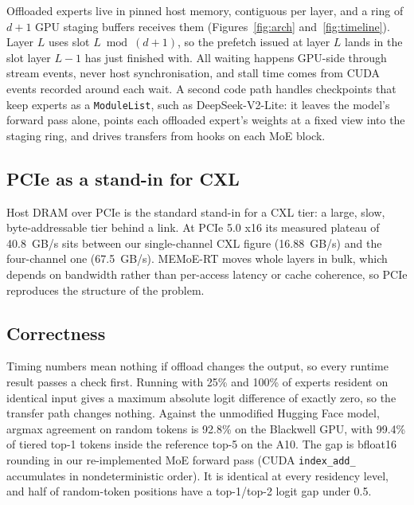 \documentclass[10pt,a4paper]{article}
\begin{document}
Offloaded experts live in pinned host memory, contiguous per layer, and a ring of
$d{+}1$ GPU staging buffers receives them (Figures~\ref{fig:arch}
and~\ref{fig:timeline}). Layer $L$ uses slot $L \bmod (d{+}1)$, so the prefetch
issued at layer $L$ lands in the slot layer $L{-}1$ has just finished with. All
waiting happens GPU-side through stream events, never host synchronisation, and
stall time comes from CUDA events recorded around each wait. A second code path
handles checkpoints that keep experts as a \texttt{ModuleList}, such as
DeepSeek-V2-Lite: it leaves the model's forward pass alone, points each offloaded
expert's weights at a fixed view into the staging ring, and drives transfers from
hooks on each MoE block.




\subsection{PCIe as a stand-in for CXL}

Host DRAM over PCIe is the standard stand-in for a CXL tier: a large, slow,
byte-addressable tier behind a link. At PCIe 5.0 x16 its measured plateau
of 40.8~GB/s sits between our single-channel CXL figure (16.88~GB/s) and the
four-channel one (67.5~GB/s). MEMoE-RT moves whole layers in bulk, which depends
on bandwidth rather than per-access latency or cache coherence, so PCIe reproduces
the structure of the problem.

\subsection{Correctness}

Timing numbers mean nothing if offload changes the output, so every runtime result
passes a check first. Running with 25\% and 100\% of experts resident on
identical input gives a maximum absolute logit difference of exactly zero, so the
transfer path changes nothing. Against the unmodified Hugging Face model, argmax
agreement on random tokens is 92.8\% on the Blackwell GPU, with 99.4\% of tiered
top-1 tokens inside the reference top-5 on the A10. The gap is bfloat16 rounding
in our re-implemented MoE forward pass (CUDA \texttt{index\_add\_} accumulates in
nondeterministic order). It is identical at every residency level, and half of
random-token positions have a top-1/top-2 logit gap under 0.5.

\end{document}
